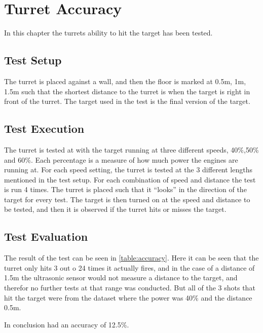 \chapter{Turret Accuracy}\label{TurretAcc}
In this chapter the turrets ability to hit the target has been tested.

\section{Test Setup}
The turret is placed against a wall, and then the floor
is marked at 0.5m, 1m, 1.5m such that the shortest distance to the turret is when
the target is right in front of the turret. The target used in the test is the final
version of the target.

\section{Test Execution}
The turret is tested at with the target running at three different speeds, 40\%,50\% and 60\%. Each percentage is a measure of how much power the engines are running at.
For each speed setting, the turret is tested at the 3 different lengths mentioned in the test setup. For each combination of speed and distance the test is run 4 times.
The turret is placed such that it ``looks'' in the direction of
the target for every test. The target is then turned on at the speed and distance to be tested, and then it is observed if the turret hits or misses the target.

\section{Test Evaluation}
The result of the test can be seen in \autoref{table:accuracy}. Here it can be
seen that the turret only hits 3 out o 24 times it actually fires, and in the case of
a distance of 1.5m the ultrasonic sensor would not measure a distance to the
target, and therefor no further tests at that range was conducted. But all of the
3 shots that hit the target were from
the dataset where the power was 40\% and the distance 0.5m.\nl

In conclusion \names had an accuracy of 12.5\%.


